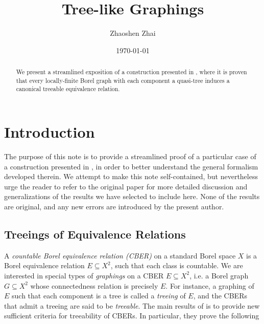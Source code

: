 \documentclass{amsart}
\begin{document}
    \title{Tree-like Graphings}
    \author{Zhaoshen Zhai}
    \date{\today}

    \begin{abstract}
        We present a streamlined exposition of a construction presented in \cite{CPTT23}, where it is proven that every locally-finite Borel graph with each component a quasi-tree induces a canonical treeable equivalence relation.
    \end{abstract}

    \maketitle

    \section{Introduction}

    The purpose of this note is to provide a streamlined proof of a particular case of a construction presented in \cite{CPTT23}, in order to better understand the general formalism developed therein. We attempt to make this note self-contained, but nevertheless urge the reader to refer to the original paper for more detailed discussion and generalizations of the results we have selected to include here. None of the results are original, and any new errors are introduced by the present author.


    \subsection{Treeings of Equivalence Relations}

    A \textit{countable Borel equivalence relation (CBER)} on a standard Borel space $X$ is a Borel equivalence relation $E\subseteq X^2$, such that each class is countable. We are interested in special types of \textit{graphings} on a CBER $E\subseteq X^2$, i.e. a Borel graph $G\subseteq X^2$ whose connectedness relation is precisely $E$. For instance, a graphing of $E$ such that each component is a tree is called a \textit{treeing} of $E$, and the CBERs that admit a treeing are said to be \textit{treeable}. The main results of \cite{CPTT23} is to provide new sufficient criteria for treeability of CBERs. In particular, they prove the following
\end{document}
